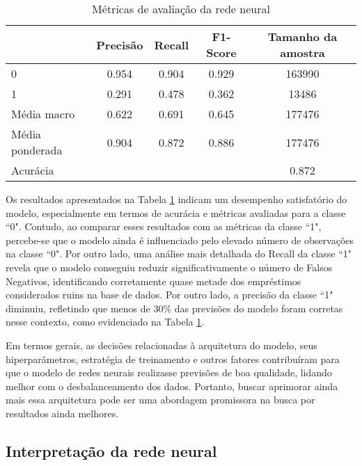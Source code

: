 \begin{table}[H]
  \centering
\begin{tabular}{lcccc}
  \hline
  &    \textbf{Precisão} & \textbf{Recall}    &   \textbf{F1-Score} &  \textbf{Tamanho da amostra} \\
  \hline
   0                &    0.954 & 0.904 &   0.929 & 163990        \\
   1                &    0.291 & 0.478 &   0.362 & 13486         \\
   Média macro      &    0.622 & 0.691 &   0.645 & 177476        \\
   Média ponderada  &    0.904 & 0.872 &   0.886 & 177476        \\ \hline
   Acurácia         &          &       &         & 0.872      \\
  \hline
\end{tabular}
\caption{Métricas de avaliação da rede neural}
\label{tab:report_model_neural_ganhador}
\end{table}


Os resultados apresentados na Tabela \ref{tab:report_model_neural_ganhador} indicam um desempenho satisfatório
do modelo, especialmente em termos de acurácia e métricas avaliadas para a classe ``0". 
Contudo, ao comparar esses resultados com as métricas da classe ``1", percebe-se que o modelo ainda
é influenciado pelo elevado número de observações na classe ``0". Por outro lado, uma análise mais detalhada 
do Recall da classe ``1" revela que o modelo conseguiu reduzir significativamente o número de Falsos Negativos,
identificando corretamente quase metade dos empréstimos considerados ruins na base de dados. Por outro lado,
a precisão da classe ``1" diminuiu, refletindo que menos de 30\% 
das previsões do modelo foram corretas nesse contexto, como evidenciado na Tabela \ref{tab:report_model_neural_ganhador}.


Em termos gerais, as decisões relacionadas à arquitetura do modelo, seus hiperparâmetros, 
estratégia de treinamento e outros fatores contribuíram para que o modelo de redes neurais realizasse previsões
de boa qualidade, lidando melhor com o desbalanceamento dos dados.  Portanto, buscar aprimorar ainda mais essa 
arquitetura pode ser uma abordagem promissora na busca por resultados ainda melhores.

\subsection{Interpretação da rede neural}


